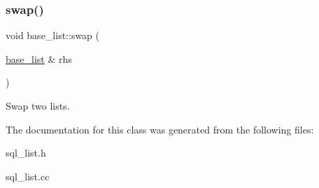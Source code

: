 \subsubsection{\texorpdfstring{swap()}{swap()}}
{\footnotesize\ttfamily void base\+\_\+list\+::swap (\begin{DoxyParamCaption}\item[{\mbox{\hyperlink{classbase__list}{base\+\_\+list}} \&}]{rhs }\end{DoxyParamCaption})\hspace{0.3cm}{\ttfamily [inline]}}

Swap two lists. 

The documentation for this class was generated from the following files\+:\begin{DoxyCompactItemize}
\item 
sql\+\_\+list.\+h\item 
sql\+\_\+list.\+cc\end{DoxyCompactItemize}

